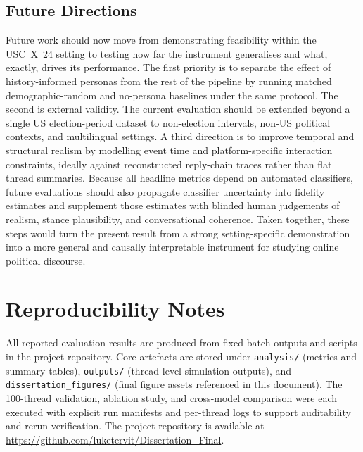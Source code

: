 \documentclass[logo,bsc,singlespacing,parskip,online]{infthesis}
\begin{document}
\section{Future Directions}
Future work should now move from demonstrating feasibility within the USC~X~24 setting to testing how far the instrument generalises and what, exactly, drives its performance. The first priority is to separate the effect of history-informed personas from the rest of the pipeline by running matched demographic-random and no-persona baselines under the same protocol. The second is external validity. The current evaluation should be extended beyond a single US election-period dataset to non-election intervals, non-US political contexts, and multilingual settings. A third direction is to improve temporal and structural realism by modelling event time and platform-specific interaction constraints, ideally against reconstructed reply-chain traces rather than flat thread summaries. Because all headline metrics depend on automated classifiers, future evaluations should also propagate classifier uncertainty into fidelity estimates and supplement those estimates with blinded human judgements of realism, stance plausibility, and conversational coherence. Taken together, these steps would turn the present result from a strong setting-specific demonstration into a more general and causally interpretable instrument for studying online political discourse.




\appendix
\chapter{Reproducibility Notes}
All reported evaluation results are produced from fixed batch outputs and scripts in the project repository. Core artefacts are stored under \texttt{analysis/} (metrics and summary tables), \texttt{outputs/} (thread-level simulation outputs), and \texttt{dissertation\_figures/} (final figure assets referenced in this document). The 100-thread validation, ablation study, and cross-model comparison were each executed with explicit run manifests and per-thread logs to support auditability and rerun verification. The project repository is available at \url{https://github.com/luketervit/Dissertation_Final}.
\end{document}
